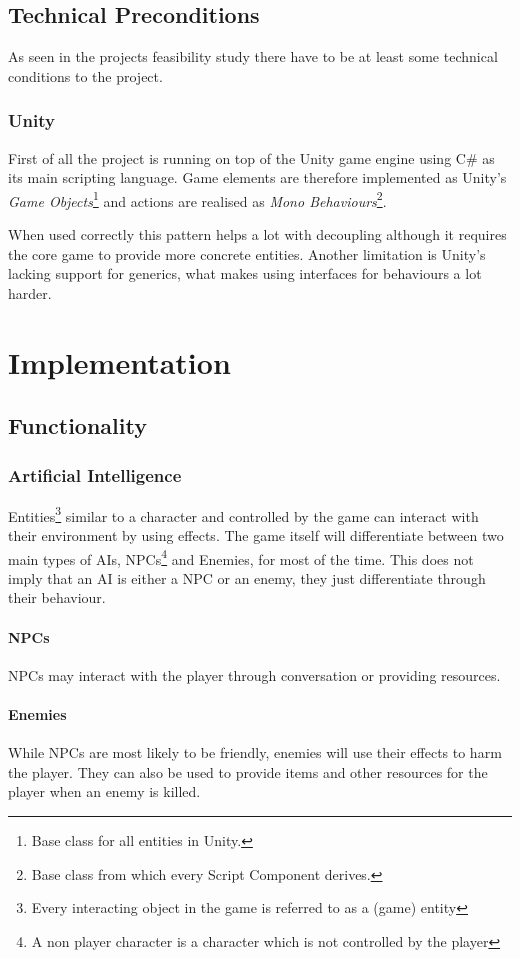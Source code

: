 \documentclass[11pt]{article}
\begin{document}
\subsection{Technical Preconditions}
As seen in the projects feasibility study there have to be at least some technical conditions to the project. 

\subsubsection{Unity}
First of all the project is running on top of the Unity game engine using C\# as its main scripting language. 
Game elements are therefore implemented as Unity's \textit{Game Objects}\footnote{Base class for all entities in Unity.} and actions are realised as \textit{Mono Behaviours}\footnote{Base class from which every Script Component derives.}. 

When used correctly this pattern helps a lot with decoupling although it requires the core game to provide more concrete entities.
Another limitation is Unity's lacking support for generics, what makes using interfaces for behaviours a lot harder.

\section{Implementation}
\subsection{Functionality}
\subsubsection{Artificial Intelligence}\label{subsec:fs10ai}
Entities\footnote{Every interacting object in the game is referred to as a (game) entity} similar to a character and controlled by the game can interact with their environment by using effects.
The game itself will differentiate between two main types of AIs, NPCs\footnote{A non player character is a character which is not controlled by the player} and Enemies, for most of the time. 
This does not imply that an AI is either a NPC or an enemy, they just differentiate through their behaviour.
\paragraph{NPCs}
NPCs may interact with the player through conversation or providing resources.
\paragraph{Enemies}
While NPCs are most likely to be friendly, enemies will use their effects to harm the player.
They can also be used to provide items and other resources for the player when an enemy is killed.
\end{document}
